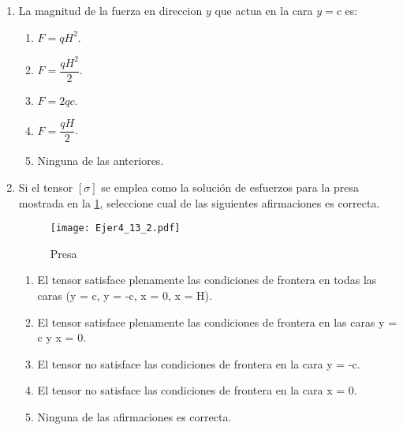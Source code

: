 \documentclass[../notas medios.tex]{subfiles}
\begin{document}
\begin{enumerate}
\begin{enumerate}
		\item La magnitud de la fuerza en direccion $y$ que actua en la cara $y = c$ es:\\
		\begin{enumerate}
		\item $F = q H^2 $.\\
		\item $F = \dfrac{q H^2}{2} $. \\
		\item $F = 2 q c $. \\
		\item $F = \dfrac{q H}{2} $. \\
		\item Ninguna de las anteriores.
		\end{enumerate}	
	
		\item Si el tensor $[\sigma]$ se emplea como la soluci\'on de esfuerzos para la presa mostrada en la \cref{presa}, seleccione cual de las siguientes afirmaciones es correcta. \\
	\begin{figure}[H]
		\centering
		\texttt{[image: Ejer4\_13\_2.pdf]} 	
		\caption{Presa}
		\label{presa}
	\end{figure}
		\begin{enumerate} 
			\item El tensor satisface plenamente las condiciones de frontera en todas las caras (y = c, y = -c, x = 0, x = H).
			\item El tensor satisface plenamente las condiciones de frontera en las caras y = c y x = 0.
			\item El tensor no satisface las condiciones de frontera en la cara y = -c.
			\item El tensor no satisface las condiciones de frontera en la cara x = 0.
			\item Ninguna de las afirmaciones es correcta.
		\end{enumerate}


\end{enumerate}
\end{enumerate}
\end{document}
